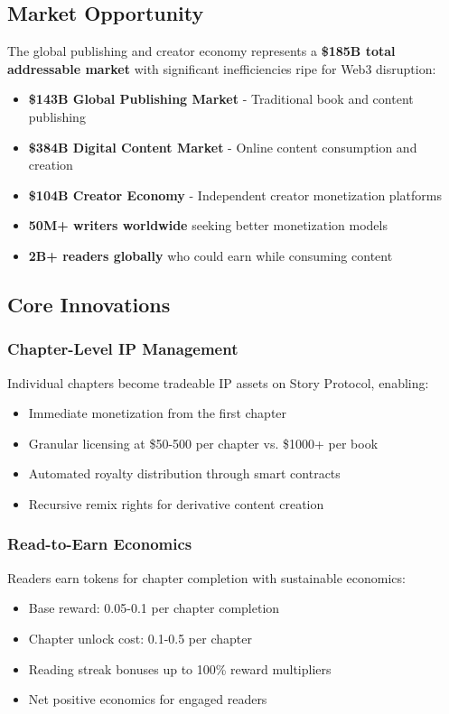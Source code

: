 \subsection{Market Opportunity}

The global publishing and creator economy represents a \textbf{\$185B total addressable market} with significant inefficiencies ripe for Web3 disruption:

\begin{itemize}
    \item \textbf{\$143B Global Publishing Market} - Traditional book and content publishing
    \item \textbf{\$384B Digital Content Market} - Online content consumption and creation
    \item \textbf{\$104B Creator Economy} - Independent creator monetization platforms
    \item \textbf{50M+ writers worldwide} seeking better monetization models
    \item \textbf{2B+ readers globally} who could earn while consuming content
\end{itemize}

\subsection{Core Innovations}

\subsubsection{Chapter-Level IP Management}
Individual chapters become tradeable IP assets on Story Protocol, enabling:
\begin{itemize}
    \item Immediate monetization from the first chapter
    \item Granular licensing at \$50-500 per chapter vs. \$1000+ per book
    \item Automated royalty distribution through smart contracts
    \item Recursive remix rights for derivative content creation
\end{itemize}

\subsubsection{Read-to-Earn Economics}
Readers earn \tip{} tokens for chapter completion with sustainable economics:
\begin{itemize}
    \item Base reward: 0.05-0.1 \tip{} per chapter completion
    \item Chapter unlock cost: 0.1-0.5 \tip{} per chapter
    \item Reading streak bonuses up to 100\% reward multipliers
    \item Net positive economics for engaged readers
\end{itemize}

